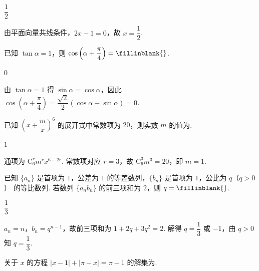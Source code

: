 \documentclass[UTF8,a4paper,oneside,11pt]{ctexbook}
\begin{document}
\begin{answer}
\(\dfrac12\)
\end{answer}

\begin{solution}
由平面向量共线条件，\(2x-1=0\)，故 \(x=\dfrac12\).
\end{solution}

\begin{problem}
已知 \(\tan\alpha=1\)，则 \(\cos\left(\alpha+\dfrac{\pi}{4}\right)=\fillinblank{}\).
\end{problem}

\begin{answer}
\(0\)
\end{answer}

\begin{solution}
由 \(\tan\alpha=1\) 得 \(\sin\alpha=\cos\alpha\)，因此
\(\cos\left(\alpha+\dfrac{\pi}{4}\right)=\dfrac{\sqrt2}{2}(\cos\alpha-\sin\alpha)=0\).
\end{solution}

\begin{problem}
已知 \(\left(x+\dfrac{m}{x}\right)^6\) 的展开式中常数项为 \(20\)，则实数 \(m\) 的值为\fillinblank{}.
\end{problem}

\begin{answer}
\(1\)
\end{answer}

\begin{solution}
通项为 \(\mathrm C_6^r m^r x^{6-2r}\). 常数项对应 \(r=3\)，故 \(\mathrm C_6^3m^3=20\)，即 \(m=1\).
\end{solution}

\begin{problem}
已知 \(\{a_n\}\) 是首项为 \(1\)，公差为 \(1\) 的等差数列，\(\{b_n\}\) 是首项为 \(1\)，公比为 \(q\)（\(q>0\)） 的等比数列. 若数列 \(\{a_nb_n\}\) 的前三项和为 \(2\)，则 \(q=\fillinblank{}\).
\end{problem}

\begin{answer}
\(\dfrac13\)
\end{answer}

\begin{solution}
\(a_n=n\)，\(b_n=q^{n-1}\)，故前三项和为 \(1+2q+3q^2=2\). 解得 \(q=\dfrac13\) 或 \(-1\)，由 \(q>0\) 知 \(q=\dfrac13\).
\end{solution}

\begin{problem}
关于 \(x\) 的方程 \(|x-1|+|\pi-x|=\pi-1\) 的解集为\fillinblank{}.
\end{problem}
\end{document}
